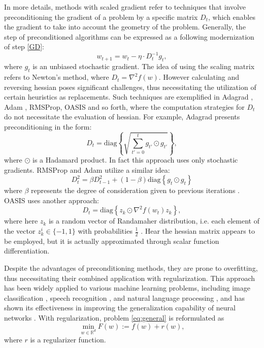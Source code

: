 \documentclass[USenglish]{article}
\theoremstyle{dgthm}
\theoremstyle{dgdef}
\begin{document}
In more details, methods with scaled gradient refer to techniques that involve preconditioning the gradient of a problem by a specific matrix $D_t$, which enables the gradient to take into account the geometry of the problem. Generally, the step of preconditioned algorithms can be expressed as a following modernization of step \eqref{GD}:
\begin{equation}
    w_{t+1} = w_t - \eta \cdot D_t^{-1} g_t,
\end{equation}
where $g_t$ is an unbiased stochastic gradient.
The idea of using the scaling matrix refers to Newton's method, where $D_t = \nabla^2 f(w)$. However calculating and reversing hessian poses significant challenges, thus necessitating the utilization of certain heuristics as replacements. Such techniques are exemplified in Adagrad \citep{duchi2011adaptive}, Adam \citep{kingma2014adam}, RMSProp, OASIS \citep{goldberg2011oasis} and so forth, where the computation strategies for $D_t$ do not necessitate the evaluation of hessian. For example, Adagrad presents preconditioning in the form:
$$ D_t = \text{diag} \left\{ \sqrt{\sum_{t'=0}^t{g_{t'} \odot g_{t'}}} \right\}, $$
where $\odot$ is a Hadamard product. In fact this approach uses only stochastic gradients.
RMSProp and Adam utilize a similar idea:
$$ D_t^2 = \beta D_{t-1}^2 + (1 - \beta) \text{diag} \left\{ g_{t} \odot g_{t} \right\} $$
where $\beta$ represents the degree of consideration given to previous iterations \citep{kingma2014adam}.
OASIS uses another approach:
$$ D_t = \text{diag} \left\{ z_k \odot \nabla^2 f(w_t) z_k \right\}, $$
where here $z_k$ is a random vector of Randamaher distribution, i.e. each element of the vector $z_k^i \in \{-1, 1\}$ with probabilities $\frac{1}{2}$ \citep{goldberg2011oasis}. Hear the hessian matrix appears to be employed, but it is actually approximated through scalar function differentiation.

Despite the advantages of preconditioning methods, they are prone to overfitting, thus necessitating their combined application with regularization. This approach has been widely applied to various machine learning problems, including image classification \citep{zhu2017learning}, speech recognition \citep{zhou2017improved}, and natural language processing \citep{wu2022stgn}, and has shown its effectiveness in improving the generalization capability of neural networks \citep{girosi1995regularization}. With regularization, problem \eqref{eq:general} is reformulated as
\begin{equation} \label{F_big}
	\min_{w \in \mathbb{R}^d} F(w) := f(w) + r(w),
\end{equation}
where $r$ is a regularizer function.
\end{document}
